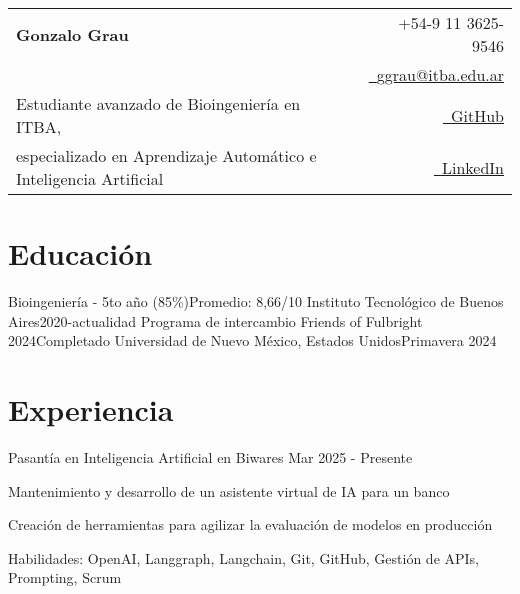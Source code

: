 \documentclass{resume}
\makeatletter
\newcommand{\name}{Gonzalo Grau} %
\renewcommand{\phone}{9 11 3625-9546} %
\newcommand{\emaila}{ggrau@itba.edu.ar} %
\makeatother
\begin{document}
    \selectfont

    {
        \begin{tabularx}{\linewidth}{L r}
            \\
            \textbf{\Huge \name} & {\raisebox{0.0\height}{\footnotesize \faPhone}\ +54-\phone}\\
            & \href{mailto:\emaila}{\raisebox{0.0\height}{\footnotesize \faEnvelope}\ {\emaila}} \\
            Estudiante avanzado de Bioingeniería en ITBA, &
            \href{https://github.com/gonzagrau}{\raisebox{0.0\height}{\footnotesize \faGithub}\ {GitHub}} \\
            especializado en Aprendizaje Automático e Inteligencia Artificial &
            \href{https://www.linkedin.com/in/gonzalo-grau/}
            {\raisebox{0.0\height}{\footnotesize \faLinkedin}\ {LinkedIn}}
        \end{tabularx}
    }




    \section{\textbf{Educación}} \label{sec:education}
    \resumeSubHeadingListStart
    \resumeSubheading
    {Bioingeniería - 5to año (85\%)}{Promedio: 8,66/10}
    {Instituto Tecnológico de Buenos Aires}{2020-actualidad}
    \resumeSubheading
    {Programa de intercambio Friends of Fulbright 2024}{Completado}
    {Universidad de Nuevo México, Estados Unidos}{Primavera 2024}

    \resumeSubHeadingListEnd

    \vspace{-5mm}


    \section{\textbf{Experiencia}} \label{sec:experience}
    \resumeSubHeadingListStart

    \resumeSubheading
    {Pasantía en Inteligencia Artificial en Biwares}
    {}{}{Mar 2025 - Presente}
    \vspace{-5mm}
    \resumeItemListStart
    \item
    {Mantenimiento y desarrollo de un asistente virtual de IA para un banco}
    \item {Creación de herramientas para agilizar la evaluación de modelos en producción}
    \item{Habilidades: OpenAI, Langgraph, Langchain, Git, GitHub, Gestión de APIs, Prompting, Scrum}
    \resumeItemListEnd
\end{document}
